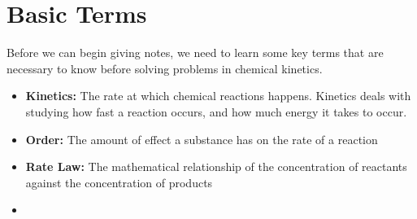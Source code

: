 \documentclass[12pt]{article}
\begin{document}
\section{Basic Terms}  
Before we can begin giving notes, we need to learn some key terms that are necessary to know before solving problems in chemical kinetics.
\begin{itemize}
    \item \textbf{Kinetics:} The rate at which chemical reactions happens. Kinetics deals with studying how fast a reaction occurs, and how much energy it takes to occur.
    \item \textbf{Order:} The amount of effect a substance has on the rate of a reaction
    \item \textbf{Rate Law:} The mathematical relationship of the concentration of reactants against the concentration of products
    \item \textbf{}
\end{itemize}
    
\end{document}
